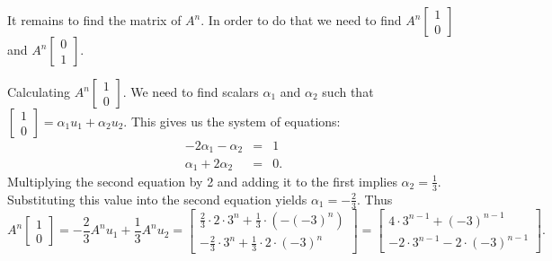 \documentclass[11pt]{article}
\theoremstyle{definition}
\theoremstyle{plain}
\begin{document}
It remains to find the matrix of \( A^n \). In order to do that we need to find \( A^n\left[\begin{array}{c}1\\0\end{array}\right]\) and \( A^n\left[\begin{array}{c}0\\1\end{array}\right]\).

Calculating \( A^n\left[\begin{array}{c}1\\0\end{array}\right]\). We need to find scalars \( \alpha_1 \) and \( \alpha_2 \) such that \( \left[\begin{array}{c}1\\0\end{array}\right]= \alpha_1u_1+\alpha_2u_2\). This gives us the system of equations: \begin{eqnarray*} -2\alpha_1-\alpha_2&=&1\\ \alpha_1+2\alpha_2&=&0. \end{eqnarray*} Multiplying the second equation by 2 and adding it to the first implies \( \alpha_2=\frac13 \). Substituting this value into the second equation yields \( \alpha_1=-\frac23 \). Thus \[A^n\left[\begin{array}{c}1\\0\end{array}\right]=-\frac23A^nu_1+\frac13A^nu_2= \left[\begin{array}{c} \frac23\cdot 2\cdot 3^n+\frac13\cdot (-(-3)^n)\\ -\frac23\cdot 3^n+\frac13\cdot 2\cdot (-3)^n \end{array}\right] =\left[\begin{array}{c} 4\cdot 3^{n-1}+(-3)^{n-1}\\ -2\cdot 3^{n-1}-2\cdot (-3)^{n-1} \end{array}\right] .\]
\end{document}
